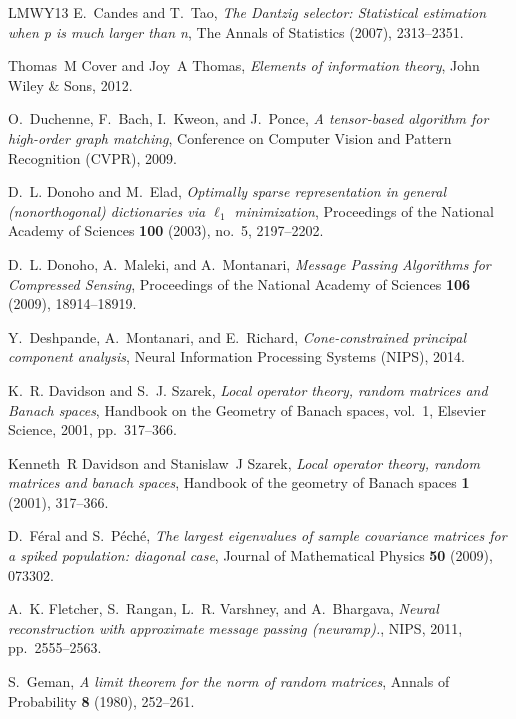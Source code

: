 \documentclass[11pt]{article}
\theoremstyle{definition}
\begin{document}
\begin{thebibliography}{LMWY13}
E.~Candes and T.~Tao, \emph{{The Dantzig selector: Statistical estimation when
  p is much larger than n}}, The Annals of Statistics (2007), 2313--2351.

Thomas~M Cover and Joy~A Thomas, \emph{Elements of information theory}, John
  Wiley \& Sons, 2012.

O.~Duchenne, F.~Bach, I.~Kweon, and J.~Ponce, \emph{A tensor-based algorithm
  for high-order graph matching}, Conference on Computer Vision and Pattern
  Recognition (CVPR), 2009.

D.~L. Donoho and M.~Elad, \emph{Optimally sparse representation in general
  (nonorthogonal) dictionaries via $\ell_1$ minimization}, Proceedings of the
  National Academy of Sciences \textbf{100} (2003), no.~5, 2197--2202.

D.~L. Donoho, A.~Maleki, and A.~Montanari, \emph{{Message Passing Algorithms
  for Compressed Sensing}}, Proceedings of the National Academy of Sciences
  \textbf{106} (2009), 18914--18919.

Y.~Deshpande, A.~Montanari, and E.~Richard, \emph{Cone-constrained principal
  component analysis}, Neural Information Processing Systems (NIPS), 2014.

K.~R. Davidson and S.~J. Szarek, \emph{Local operator theory, random matrices
  and {B}anach spaces}, Handbook on the Geometry of Banach spaces, vol.~1,
  Elsevier Science, 2001, pp.~317--366.

Kenneth~R Davidson and Stanislaw~J Szarek, \emph{Local operator theory, random
  matrices and banach spaces}, Handbook of the geometry of Banach spaces
  \textbf{1} (2001), 317--366.

D.~F{\'e}ral and S.~P{\'e}ch{\'e}, \emph{The largest eigenvalues of sample
  covariance matrices for a spiked population: diagonal case}, Journal of
  Mathematical Physics \textbf{50} (2009), 073302.

A.~K. Fletcher, S.~Rangan, L.~R. Varshney, and A.~Bhargava, \emph{Neural
  reconstruction with approximate message passing (neuramp).}, NIPS, 2011,
  pp.~2555--2563.

S.~Geman, \emph{{A limit theorem for the norm of random matrices}}, Annals of
  Probability \textbf{8} (1980), 252--261.


\end{thebibliography}
\end{document}
